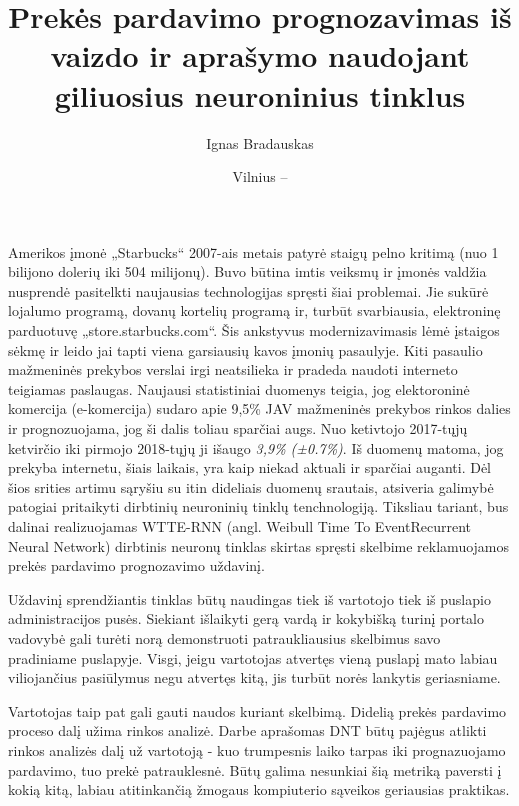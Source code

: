 \documentclass{VUMIFPSkursinis}
\title{Prekės pardavimo prognozavimas iš vaizdo ir aprašymo naudojant giliuosius neuroninius tinklus}
\author{Ignas Bradauskas}
\date{Vilnius – \the\year}
\begin{document}
\maketitle


Amerikos įmonė „Starbucks“ 2007-ais metais patyrė staigų pelno kritimą (nuo 1 bilijono dolerių iki 504 milijonų). 
Buvo būtina imtis veiksmų ir įmonės valdžia nusprendė pasitelkti naujausias technologijas spręsti šiai problemai. Jie sukūrė lojalumo programą, dovanų kortelių programą ir, turbūt svarbiausia, elektroninę parduotuvę „store.starbucks.com“.
Šis ankstyvus modernizavimasis lėmė įstaigos sėkmę ir leido jai tapti viena garsiausių kavos įmonių pasaulyje. Kiti
pasaulio mažmeninės prekybos verslai irgi neatsilieka ir pradeda naudoti interneto teigiamas paslaugas. Naujausi statistiniai duomenys
teigia, jog elektoroninė komercija (e-komercija) sudaro apie 9,5\% JAV mažmeninės prekybos rinkos dalies ir prognozuojama, jog ši dalis toliau sparčiai augs. Nuo ketivtojo 2017-tųjų ketvirčio iki pirmojo 2018-tųjų ji išaugo \textit{3,9\%  (±0.7\%)}. Iš duomenų matoma, jog prekyba internetu, šiais laikais, yra kaip niekad aktuali ir sparčiai auganti. Dėl šios srities artimu sąryšiu su itin dideliais duomenų srautais, atsiveria galimybė patogiai pritaikyti dirbtinių neuroninių tinklų tenchnologiją. Tiksliau tariant, bus dalinai realizuojamas WTTE-RNN (angl. Weibull Time To EventRecurrent Neural Network) dirbtinis neuronų tinklas skirtas spręsti skelbime reklamuojamos prekės pardavimo prognozavimo uždavinį. 

Uždavinį sprendžiantis tinklas būtų naudingas tiek iš vartotojo tiek iš puslapio administracijos pusės. Siekiant išlaikyti gerą vardą ir kokybišką turinį portalo vadovybė gali turėti norą demonstruoti patraukliausius skelbimus savo pradiniame puslapyje. Visgi, jeigu vartotojas atvertęs vieną puslapį mato labiau viliojančius pasiūlymus negu atvertęs kitą, jis turbūt norės lankytis geriasniame.

Vartotojas taip pat gali gauti naudos kuriant skelbimą. Didelią prekės pardavimo proceso dalį užima rinkos analizė. Darbe aprašomas DNT būtų pajėgus atlikti rinkos analizės dalį už vartotoją - kuo trumpesnis laiko tarpas iki prognazuojamo pardavimo, tuo prekė patrauklesnė. Būtų galima nesunkiai šią metriką paversti į kokią kitą, labiau atitinkančią žmogaus kompiuterio sąveikos geriausias praktikas.
\end{document}
